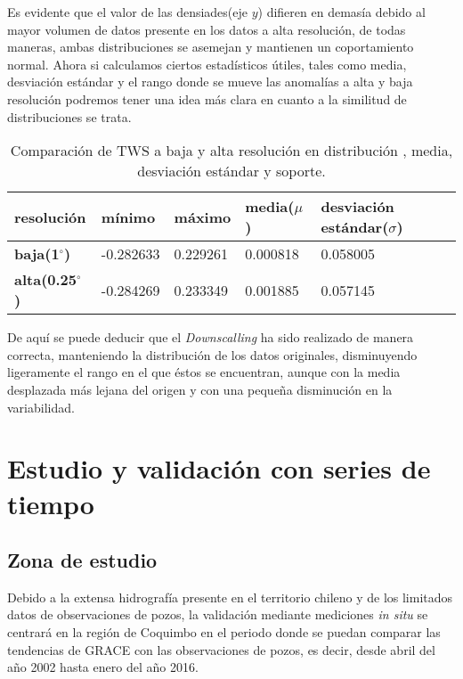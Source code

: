 Es evidente que el valor de las densiades(eje $y$) difieren en demasía debido al mayor volumen de datos presente en los datos a alta resolución, de todas maneras, ambas distribuciones
se asemejan y mantienen un coportamiento normal. Ahora si calculamos ciertos estadísticos útiles, tales como media, desviación estándar y el rango donde se mueve las anomalías a alta y baja resolución podremos tener una idea más clara 
en cuanto a la similitud de distribuciones se trata.

\begin{table}[H] 
    \caption[Comparación de distribuciones de TWS a baja y alta resolución]{Comparación de TWS a baja y alta resolución en distribución , media, desviación estándar y soporte.}
    \begin{tabularx}{0.9\textwidth}{CCCCC}
    \toprule
    \textbf{resolución}	& \textbf{mínimo}	& \textbf{máximo} & \textbf{media($\mu$)} & \textbf{desviación estándar($\sigma$)}\\
        \midrule
        \textbf{baja(1$^{\circ}$)}		& -0.282633 & 0.229261  & 0.000818 & 0.058005\\
        \textbf{alta(0.25$^{\circ}$)}   & -0.284269 & 0.233349	& 0.001885 & 0.057145\\
        \bottomrule
    \end{tabularx}
\end{table}

De aquí se puede deducir que el \textit{Downscalling} ha sido realizado de manera correcta, manteniendo la distribución de los datos originales, disminuyendo ligeramente el rango en el que éstos se encuentran,
aunque con la media desplazada más lejana del origen y con una pequeña disminución en la variabilidad.


%
%
%
%


\section{Estudio y validación con series de tiempo}

\subsection{Zona de estudio}

Debido a la extensa hidrografía presente en el territorio chileno y de los limitados datos de observaciones de pozos, la validación mediante mediciones \textit{in situ} se centrará
en la región de Coquimbo en el periodo donde se puedan comparar las tendencias de GRACE con las observaciones de pozos, es decir, desde abril del año 2002 hasta enero del año 2016. 

